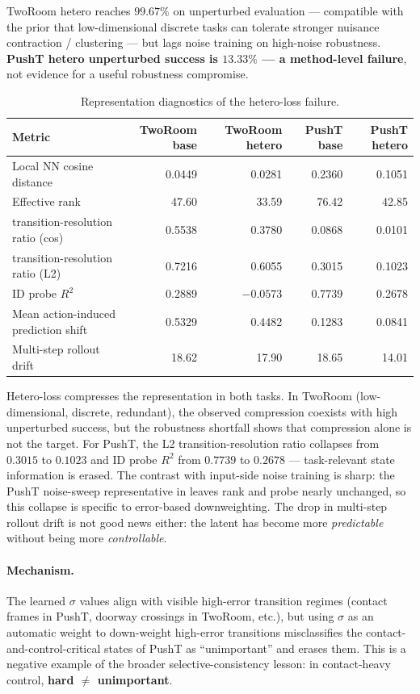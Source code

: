 \documentclass[10pt]{article}
\newcommand{\transres}{transition-resolution ratio}
\newcommand{\idprobe}{ID probe $R^{2}$}
\begin{document}
TwoRoom hetero reaches $99.67\%$ on unperturbed evaluation --- compatible with the prior that low-dimensional discrete tasks can tolerate stronger nuisance contraction / clustering --- but lags noise training on high-noise robustness. \textbf{PushT hetero unperturbed success is $13.33\%$ --- a method-level failure}, not evidence for a useful robustness compromise.

\begin{table}[H]
\centering
\caption{Representation diagnostics of the hetero-loss failure.}
\label{tab:hetero-diag}
\small
\setlength{\tabcolsep}{4pt}
\begin{tabular}{lrrrr}
\toprule
Metric & TwoRoom base & TwoRoom hetero & PushT base & PushT hetero \\
\midrule
Local NN cosine distance & 0.0449 & 0.0281 & 0.2360 & 0.1051 \\
Effective rank       & 47.60  & 33.59  & 76.42  & 42.85  \\
\transres{} (cos) & 0.5538 & 0.3780 & 0.0868 & 0.0101 \\
\transres{} (L2) & 0.7216 & 0.6055 & 0.3015 & 0.1023 \\
\idprobe{}            & 0.2889 & $-0.0573$ & 0.7739 & 0.2678 \\
Mean action-induced prediction shift & 0.5329 & 0.4482 & 0.1283 & 0.0841 \\
Multi-step rollout drift      & 18.62  & 17.90  & 18.65  & 14.01  \\
\bottomrule
\end{tabular}
\end{table}

Hetero-loss compresses the representation in both tasks. In TwoRoom (low-dimensional, discrete, redundant), the observed compression coexists with high unperturbed success, but the robustness shortfall shows that compression alone is not the target. For PushT, the L2 \transres{} collapses from $0.3015$ to $0.1023$ and \idprobe{} from $0.7739$ to $0.2678$ --- task-relevant state information is erased. The contrast with input-side noise training is sharp: the PushT noise-sweep representative in  leaves rank and probe nearly unchanged, so this collapse is specific to error-based downweighting. The drop in multi-step rollout drift is not good news either: the latent has become more \emph{predictable} without being more \emph{controllable}.

\paragraph{Mechanism.} The learned $\sigma$ values align with visible high-error transition regimes (contact frames in PushT, doorway crossings in TwoRoom, etc.), but using $\sigma$ as an automatic weight to down-weight high-error transitions misclassifies the contact-and-control-critical states of PushT as ``unimportant'' and erases them. This is a negative example of the broader selective-consistency lesson: in contact-heavy control, \textbf{hard $\ne$ unimportant}.
\end{document}
